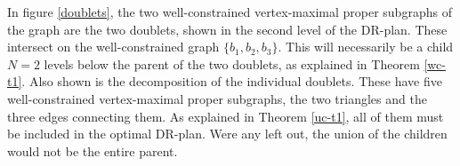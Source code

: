 \begin{example}
    In figure \ref{doublets}, the two well-constrained vertex-maximal proper subgraphs of the graph are the two doublets, shown in the second level of the DR-plan. These intersect on the well-constrained graph $\{b_1,b_2,b_3\}$. This will necessarily be a child $N=2$ levels below the parent of the two doublets, as explained in Theorem \ref{wc-t1}. Also shown is the decomposition of the individual doublets. These have five well-constrained vertex-maximal proper subgraphs, the two triangles and the three edges connecting them. As explained in Theorem \ref{uc-t1}, all of them must be included in the optimal DR-plan. Were any left out, the union of the children would not be the entire parent.
\end{example}



